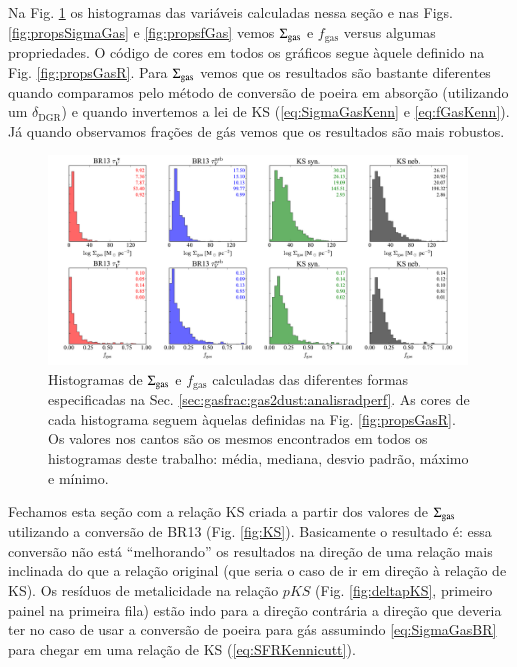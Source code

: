 Na Fig. \ref{fig:histoGas} os histogramas das variáveis calculadas nessa seção e nas Figs.
\ref{fig:propsSigmaGas} e \ref{fig:propsfGas} vemos $\SigmaGas$ e $f_{\mathrm{gas}}$ versus algumas
propriedades. O código de cores em todos os gráficos segue àquele definido na Fig.
\ref{fig:propsGasR}. Para $\SigmaGas$ vemos que os resultados são bastante diferentes quando
comparamos pelo método de conversão de poeira em absorção (utilizando um $\delta_{\mathrm{DGR}}$) e
quando invertemos a lei de KS (\eqref{eq:SigmaGasKenn} e \eqref{eq:fGasKenn}). Já quando observamos
frações de gás vemos que os resultados são mais robustos. 

\begin{figure}
	\centering
	\includegraphics[width=0.99\textwidth]{figuras/histo_gas_R.pdf}
	\caption[Histogramas de $\SigmaGas$ e $f_{\mathrm{gas}}$.]
	{Histogramas de $\SigmaGas$ e $f_{\mathrm{gas}}$ calculadas das diferentes formas especificadas
na Sec. \ref{sec:gasfrac:gas2dust:analisradperf}. As cores de cada histograma seguem àquelas
definidas na Fig. \ref{fig:propsGasR}. Os valores nos cantos são os mesmos encontrados em todos os
histogramas deste trabalho: média, mediana, desvio padrão, máximo e mínimo.}
	\label{fig:histoGas}
\end{figure}

Fechamos esta seção com a relação KS criada a partir dos valores de $\SigmaGas$ utilizando a
conversão de BR13 (Fig. \ref{fig:KS}). Basicamente o resultado é: essa conversão não está
``melhorando'' os resultados na direção de uma relação mais inclinada do que a relação original
(que seria o caso de ir em direção à relação de KS). Os resíduos de metalicidade na relação $pKS$
(Fig. \ref{fig:deltapKS}, primeiro painel na primeira fila) estão indo para a direção contrária a
direção que deveria ter no caso de usar a conversão de poeira para gás assumindo
\eqref{eq:SigmaGasBR} para chegar em uma relação de KS (\eqref{eq:SFRKennicutt}).

